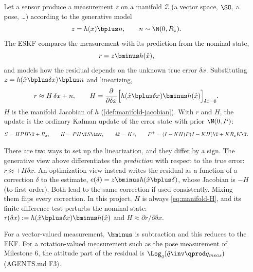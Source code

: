 Let a sensor produce a measurement $z$ on a manifold $\mathcal{Z}$ (a vector space, $\SO$, a pose, \dots)
according to the generative model
\begin{equation}
  z = h(x)\bplus n, \qquad n \sim \N(0, R_z).
\end{equation}
The ESKF compares the measurement with its prediction from the nominal state,
\begin{equation}
  r = z \bminus h(\hat x),
  \label{eq:manifold-residual}
\end{equation}
and models how the residual depends on the unknown true error $\delta x$. Substituting
$z = h(\hat x\bplus\delta x)\bplus n$ and linearizing,
\begin{equation}
  r \approx H\,\delta x + n, \qquad
  H = \frac{\partial}{\partial\delta x}\Big[ h(\hat x\bplus\delta x)\bminus h(\hat x) \Big]_{\delta x = 0}.
  \label{eq:manifold-H}
\end{equation}
$H$ is the manifold Jacobian of $h$ (\cref{def:manifold-jacobian}). With $r$ and $H$, the update is the
ordinary Kalman update of the error state with prior $\N(0, P)$:
\begin{equation}
  S = HPH\T + R_z,\qquad K = PH\T S\inv,\qquad \delta\hat x = Kr,\qquad P^+ = (I - KH)P(I - KH)\T + KR_zK\T.
\end{equation}

\begin{pitfall}
There are two ways to set up the linearization, and they differ by a sign. The generative view above
differentiates the \emph{prediction} with respect to the \emph{true} error: $r \approx +H\delta x$. An
optimization view instead writes the residual as a function of a correction $\delta$ to the estimate,
$e(\delta) = z\bminus h(\hat x\bplus\delta)$, whose Jacobian is $-H$ (to first order). Both lead to the same
correction if used consistently. Mixing them flips every correction. In this project, $H$ is always
\eqref{eq:manifold-H}, and its finite-difference test perturbs the nominal state:
$r(\delta x) := h(\hat x\bplus\delta x)\bminus h(\hat x)$ and $H \approx \partial r/\partial\delta x$.
\end{pitfall}

For a vector-valued measurement, $\bminus$ is subtraction and this reduces to the EKF. For a
rotation-valued measurement such as the pose measurement of Milestone 6, the attitude part of the residual
is $\Log_q(\hat q\inv\qprod q_{meas})$ (AGENTS.md F3).

